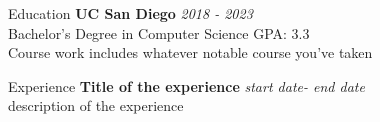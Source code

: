 

	\begin{rSection}{Education}
		{\bf UC San Diego} \hfill {\em 2018 - 2023} 
		\\ Bachelor's Degree in Computer Science\hfill { GPA: 3.3 }
		\\ Course work includes whatever notable course you've taken
		\\

	\end{rSection}
	
	\begin{rSection}{Experience}
		{\bf Title of the experience} \hfill {\em start date- end date}\\
		description of the experience\\\\
	\end{rSection}
	
